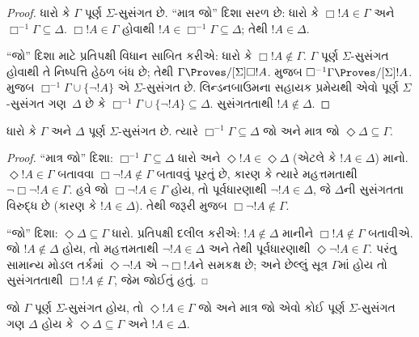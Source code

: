 \begin{proof}
  ધારો કે $\Gamma$ પૂર્ણ $\Sigma$-સુસંગત છે. ``માત્ર જો'' દિશા
  સરળ છે: ધારો કે $\Box !A \in \Gamma$ અને $\Box^{-1}\Gamma
  \subseteq \Delta$. $\Box!A \in \Gamma$ હોવાથી
  $!A \in \Box^{-1}\Gamma \subseteq \Delta$; તેથી
  $!A \in \Delta$.

  ``જો'' દિશા માટે પ્રતિપક્ષી વિધાન સાબિત કરીએ: ધારો કે
  $\Box!A \notin \Gamma$. $\Gamma$ પૂર્ણ $\Sigma$-સુસંગત હોવાથી
  તે નિષ્પત્તિ હેઠળ બંધ છે; તેથી $\Gamma \Proves/[\Sigma] \Box !A$.
   મુજબ $\Box^{-1}\Gamma \Proves/[\Sigma] !A$.
  મુજબ $\Box^{-1}\Gamma \cup \{ \lnot!A \}$ એ
  $\Sigma$-સુસંગત છે. લિન્ડનબાઉમના સહાયક પ્રમેયથી એવો પૂર્ણ
  $\Sigma$-સુસંગત ગણ~$\Delta$ છે કે $\Box^{-1}\Gamma \cup
  \{ \lnot!A \} \subseteq \Delta$. સુસંગતતાથી $!A \notin \Delta$.
\end{proof}

\begin{lem}
  ધારો કે $\Gamma$ અને $\Delta$ પૂર્ણ $\Sigma$-સુસંગત છે.
  ત્યારે $\Box^{-1}\Gamma \subseteq \Delta$ જો અને માત્ર જો
  $\Diamond\Delta \subseteq \Gamma$.
\end{lem}

\begin{proof}
  ``માત્ર જો'' દિશા: $\Box^{-1}\Gamma \subseteq \Delta$ ધારો અને
  $\Diamond!A \in \Diamond\Delta$ (એટલે કે $!A \in \Delta$)
  માનો. $\Diamond!A \in \Gamma$ બતાવવા $\Box\lnot!A \notin
  \Gamma$ બતાવવું પૂરતું છે, કારણ કે ત્યારે મહત્તમતાથી
  $\lnot\Box\lnot !A \in \Gamma$. હવે જો $\Box\lnot!A \in
  \Gamma$ હોય, તો પૂર્વધારણાથી $\lnot!A \in \Delta$, જે
  $\Delta$ની સુસંગતતા વિરુદ્ધ છે (કારણ કે $!A \in \Delta$).
  તેથી જરૂરી મુજબ $\Box\lnot!A \notin \Gamma$.

  ``જો'' દિશા: $\Diamond\Delta \subseteq \Gamma$ ધારો.
  પ્રતિપક્ષી દલીલ કરીએ: $!A \notin \Delta$ માનીને
  $\Box!A \notin \Gamma$ બતાવીએ. જો $!A \notin \Delta$ હોય,
  તો મહત્તમતાથી $\lnot!A \in \Delta$ અને તેથી પૂર્વધારણાથી
  $\Diamond\lnot!A \in \Gamma$. પરંતુ સામાન્ય મોડલ તર્કમાં
  $\Diamond\lnot!A$ એ $\lnot\Box !A$ને સમકક્ષ છે; અને છેલ્લું
  સૂત્ર $\Gamma$માં હોય તો સુસંગતતાથી $\Box!A \notin\Gamma$,
  જેમ જોઈતું હતું.
\end{proof}

%

\begin{prop}
  જો $\Gamma$ પૂર્ણ $\Sigma$-સુસંગત હોય, તો $\Diamond !A \in
  \Gamma$ જો અને માત્ર જો એવો કોઈ પૂર્ણ $\Sigma$-સુસંગત ગણ
  $\Delta$ હોય કે $\Diamond\Delta \subseteq \Gamma$ અને
  $!A \in \Delta$.
\end{prop}


